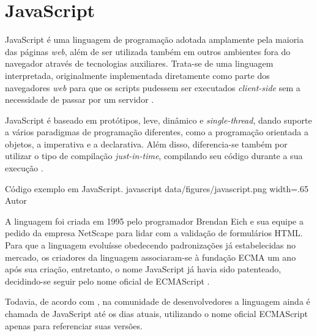 \section{JavaScript}
\label{sec:javascript}
JavaScript é uma linguagem de programação adotada amplamente pela maioria das páginas \textit{web}, além de ser utilizada também em outros ambientes fora do navegador através de tecnologias auxiliares. Trata-se de uma linguagem interpretada, originalmente implementada diretamente como parte dos navegadores \textit{web} para que os scripts pudessem ser executados \textit{client-side} sem a necessidade de passar por um servidor \cite{Mozilla2023}.

JavaScript é baseado em protótipos, leve, dinâmico e \textit{single-thread}, dando suporte a vários paradigmas de programação diferentes, como a programação orientada a objetos, a imperativa e a declarativa. Além disso, diferencia-se também por utilizar o tipo de compilação \textit{just-in-time}, compilando seu código durante a sua execução \cite{Mozilla2023}.

\image
    {Código exemplo em JavaScript.}
    {javascript}
    {data/figures/javascript.png}
    {width=.65\textwidth}
    {Autor}

A linguagem foi criada em 1995 pelo programador Brendan Eich e sua equipe a pedido da empresa NetScape para lidar com a validação de formulários HTML. Para que a linguagem evoluísse obedecendo padronizações já estabelecidas no mercado, os criadores da linguagem associaram-se à fundação ECMA um ano após sua criação, entretanto, o nome JavaScript já havia sido patenteado, decidindo-se seguir pelo nome oficial de ECMAScript \cite{Malavasi2017}.

Todavia, de acordo com , na comunidade de desenvolvedores a linguagem ainda é chamada de JavaScript até os dias atuais, utilizando o nome oficial ECMAScript apenas para referenciar suas versões.